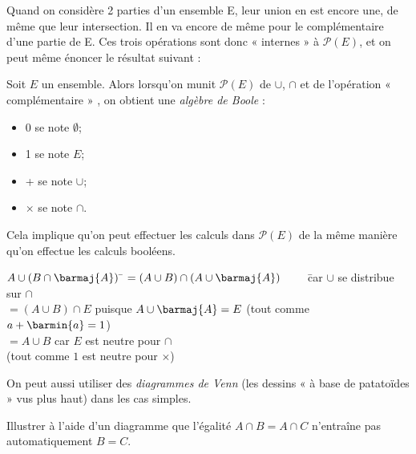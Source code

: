 \begin{remarque}[]
    Quand on considère 2 parties d'un ensemble E, leur union en est encore une, de même que leur intersection. Il en va encore de même pour le complémentaire d'une partie de E. Ces trois opérations sont donc « internes »  à $\mathcal{P}(E)$, et on peut même énoncer le résultat suivant :
\end{remarque}

\begin{propriete}[]
    Soit $E$ un ensemble. Alors lorsqu'on munit $\mathcal{P}(E)$ de $\cup$, $\cap$ et de l'opération « complémentaire » , on obtient une \textit{algèbre de Boole} :\begin{itemize}
        \item 	0 se note $\emptyset$;
        \item 	1 se note $E$;
        \item 	+ se note $\cup$;
        \item 	$\times$ se note $\cap$.
    \end{itemize}
\end{propriete}
Cela implique qu'on peut effectuer les calculs dans $\mathcal{P}(E)$ de la même manière qu'on effectue les calculs booléens.
\begin{exemple}[]
    \begin{tabbing}
        $A\cup(B\cap \barmaj{A})$ \= $=(A\cup B)\cap(A\cup \barmaj{A})\qquad$ \=car $\cup$ se distribue sur $\cap$\\
        \> $= (A\cup B)\cap E$ \>puisque $A\cup \barmaj{A}=E$ (tout comme $a+\barmin{a}=1$)\\
        \> $= A\cup B$ \> car $E$ est neutre pour $\cap$ \\
        \> \>(tout comme $1$ est neutre pour $\times$)
    \end{tabbing}
\end{exemple}

On peut aussi utiliser des \textit{diagrammes de Venn} (les dessins « à base de patatoïdes »  vus plus haut) dans les cas simples.

\begin{exercice}[]
    Illustrer à l'aide d'un diagramme  que l'égalité $A\cap B = A\cap C$ n'entraîne pas automatiquement $B=C$.
\end{exercice}

